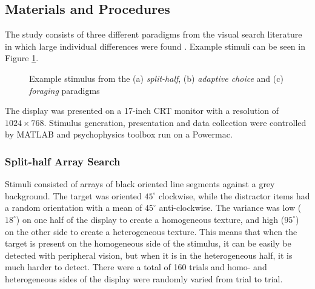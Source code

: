 \documentclass[]{rsos}%
\begin{document}
\subsection{Materials and Procedures}

The study consists of three different paradigms from the visual search literature in which large individual differences were found \cite{nowakowsak2017, irons-leber2016, kristjansson2014}. Example stimuli can be seen in Figure \ref{fig:exampleStimuli}.

\begin{figure}
\centering
{}
\caption{Example stimulus from the (a) \textit{split-half}, (b) \textit{adaptive choice} and (c) \textit{foraging} paradigms}
\label{fig:exampleStimuli}
\end{figure}

The display was presented on a 17-inch CRT monitor with a resolution of $1024 \times 
768$. Stimulus generation, presentation and data collection were controlled by MATLAB and psychophysics toolbox \cite{brainard1997} run on a Powermac. 

\subsubsection{Split-half Array Search}

Stimuli consisted of arrays of black oriented line segments against a grey background. The target was oriented $45^{\circ}$ clockwise, while the distractor items had a random orientation with a mean of $45^{\circ}$ anti-clockwise. The variance was low ($18^{\circ}$) on one half of the display to create a homogeneous texture, and high ($95^{\circ}$) on the other side to create a heterogeneous texture. This means that when the target is present on the homogeneous side of the stimulus, it can be easily be detected with peripheral vision, but when it is in the heterogeneous half, it is much harder to detect. There were a total of 160 trials and homo- and heterogeneous sides of the display were randomly varied from trial to trial.
 
\end{document}
